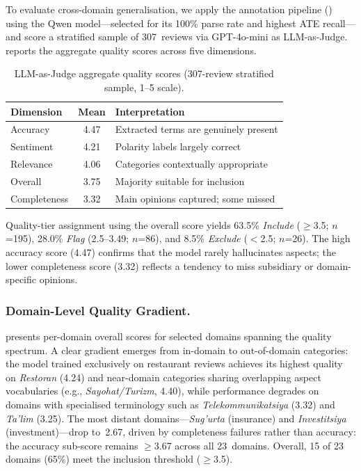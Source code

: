 \documentclass[runningheads]{llncs}
\begin{document}
To evaluate cross-domain generalisation, we apply the annotation pipeline () using the Qwen model---selected for its 100\% parse rate and highest ATE recall---and score a stratified sample of 307~reviews via GPT-4o-mini as LLM-as-Judge.  reports the aggregate quality scores across five dimensions.

\begin{table}[t]
\centering
\caption{LLM-as-Judge aggregate quality scores (307-review stratified sample, 1--5 scale).}
\label{tab:judge_agg}
\begin{tabular}{lc l}
\toprule
\textbf{Dimension} & \textbf{Mean} & \textbf{Interpretation} \\
\midrule
Accuracy     & 4.47 & Extracted terms are genuinely present \\
Sentiment    & 4.21 & Polarity labels largely correct \\
Relevance    & 4.06 & Categories contextually appropriate \\
Overall      & 3.75 & Majority suitable for inclusion \\
Completeness & 3.32 & Main opinions captured; some missed \\
\bottomrule
\end{tabular}
\end{table}

Quality-tier assignment using the overall score yields 63.5\% \emph{Include} ($\geq$3.5; $n$=195), 28.0\% \emph{Flag} (2.5--3.49; $n$=86), and 8.5\% \emph{Exclude} ($<$2.5; $n$=26). The high accuracy score (4.47) confirms that the model rarely hallucinates aspects; the lower completeness score (3.32) reflects a tendency to miss subsidiary or domain-specific opinions.

\subsubsection{Domain-Level Quality Gradient.}
\label{sec:res_domain_gradient}

 presents per-domain overall scores for selected domains spanning the quality spectrum. A clear gradient emerges from in-domain to out-of-domain categories: the model trained exclusively on restaurant reviews achieves its highest quality on \emph{Restoran} (4.24) and near-domain categories sharing overlapping aspect vocabularies (e.g., \emph{Sayohat/Turizm}, 4.40), while performance degrades on domains with specialised terminology such as \emph{Telekommunikatsiya} (3.32) and \emph{Ta'lim} (3.25). The most distant domains---\emph{Sug'urta} (insurance) and \emph{Investitsiya} (investment)---drop to~2.67, driven by completeness failures rather than accuracy: the accuracy sub-score remains $\geq$3.67 across all 23~domains. Overall, 15 of 23 domains (65\%) meet the inclusion threshold ($\geq$3.5).
\end{document}
